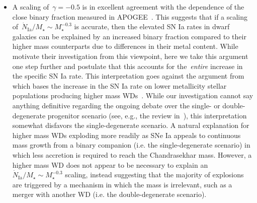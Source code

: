 \documentclass[ms.tex]{subfiles}
\begin{document}
\begin{itemize}
	\item A scaling of~$\gamma = -0.5$ is in excellent agreement with the
	dependence of the close binary fraction measured in APOGEE~\citep{Moe2019}.
	This suggests that if a scaling of~$\dot{N}_\text{Ia} / M_\star \sim
	M_\star^{-0.3}$ is accurate, then the elevated SN Ia rates in dwarf
	galaxies can be explained by an increased binary fraction compared to their
	higher mass counterparts due to differences in their metal content.
	While~\citet{Gandhi2022} motivate their investigation from this viewpoint,
	here we take this argument one step further and postulate that this
	accounts for the~\textit{entire} increase in the specific SN Ia rate.
	This interpretation goes against the argument from~\citet{Kistler2013}
	which bases the increase in the SN Ia rate on lower metallicity stellar
	populations producing higher mass WDs~\citep{Umeda1999, Willson2000,
	Marigo2007, Meng2008, Zhao2012, Kalirai2014}.
	While our investigation cannot say anything definitive regarding the
	ongoing debate over the single- or double-degenerate progenitor scenario
	(see, e.g., the review in~\citealp{Maoz2014}), this interpretation somewhat
	disfavors the single-degenerate scenario.
	A natural explanation for higher mass WDs exploding more readily as SNe Ia
	appeals to continuous mass growth from a binary companion (i.e. the
	single-degenerate scenario) in which less accretion is required to reach
	the Chandrasekhar mass.
	However, a higher mass WD does not appear to be necessary to explain an
	$\dot{N}_\text{Ia} / M_\star \sim M_\star^{-0.3}$ scaling, instead
	suggesting that the majority of explosions are triggered by a mechanism
	in which the mass is irrelevant, such as a merger with another WD (i.e.
	the double-degenerate scenario).


\end{itemize}
\end{document}
